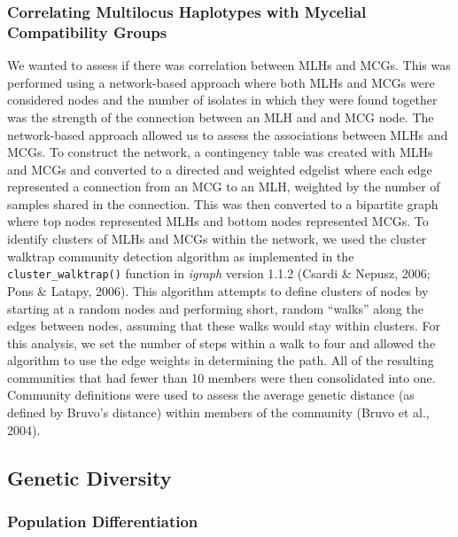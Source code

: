 \documentclass[fleqn,10pt,lineno]{wlpeerj} %
\theoremstyle{definition}
\theoremstyle{definition}
\theoremstyle{definition}
\theoremstyle{remark}
\begin{document}
\subsubsection*{Correlating Multilocus Haplotypes with Mycelial
Compatibility
Groups}\label{correlating-multilocus-haplotypes-with-mycelial-compatibility-groups}

We wanted to assess if there was correlation between MLHs and MCGs. This
was performed using a network-based approach where both MLHs and MCGs
were considered nodes and the number of isolates in which they were
found together was the strength of the connection between an MLH and and
MCG node. The network-based approach allowed us to assess the
associations between MLHs and MCGs. To construct the network, a
contingency table was created with MLHs and MCGs and converted to a
directed and weighted edgelist where each edge represented a connection
from an MCG to an MLH, weighted by the number of samples shared in the
connection. This was then converted to a bipartite graph where top nodes
represented MLHs and bottom nodes represented MCGs. To identify clusters
of MLHs and MCGs within the network, we used the cluster walktrap
community detection algorithm as implemented in the
\texttt{cluster\_walktrap()} function in \emph{igraph} version 1.1.2
(Csardi \& Nepusz, 2006; Pons \& Latapy, 2006). This algorithm attempts
to define clusters of nodes by starting at a random nodes and performing
short, random ``walks'' along the edges between nodes, assuming that
these walks would stay within clusters. For this analysis, we set the
number of steps within a walk to four and allowed the algorithm to use
the edge weights in determining the path. All of the resulting
communities that had fewer than 10 members were then consolidated into
one. Community definitions were used to assess the average genetic
distance (as defined by Bruvo's distance) within members of the
community (Bruvo et al., 2004).

\subsection*{Genetic Diversity}\label{genetic-diversity}

\subsubsection*{Population
Differentiation}\label{population-differentiation}
\end{document}
